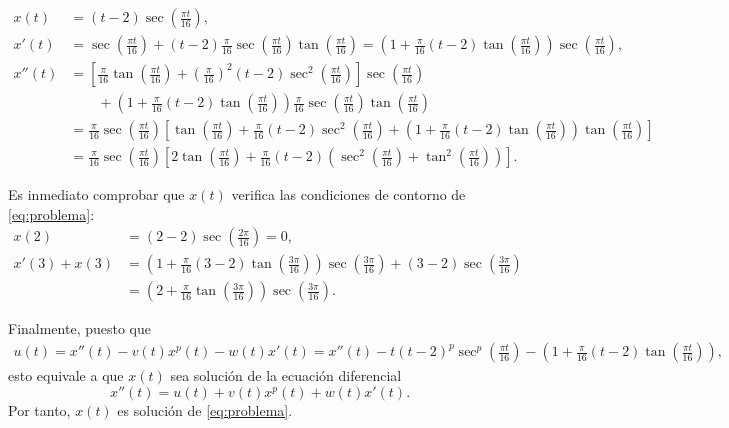 \documentclass[11pt]{article}
\begin{document}
\begin{align*}
    x(t) &= (t-2)\sec \left(\frac{\pi t}{16}\right),\\
    x'(t) &= \sec \left(\frac{\pi t}{16}\right) + (t-2)\frac{\pi}{16}\sec \left(\frac{\pi t}{16}\right)\tan\left(\frac{\pi t}{16}\right) = \left( 1+\frac{\pi}{16}(t-2)\tan\left(\frac{\pi t}{16}\right) \right) \sec \left(\frac{\pi t}{16}\right),\\
    x''(t) &= \left[ \frac{\pi}{16}\tan\left(\frac{\pi t}{16} \right) + \left(\frac{\pi}{16}\right)^2(t-2)\sec^2 \left(\frac{\pi t}{16}\right) \right]\sec \left(\frac{\pi t}{16}\right)\\
    & \qquad + \left( 1+\frac{\pi}{16}(t-2)\tan\left(\frac{\pi t}{16} \right) \right)\frac{\pi}{16}\sec\left(\frac{\pi t}{16} \right)\tan\left(\frac{\pi t}{16} \right)\\
    &=  \frac{\pi}{16}\sec\left(\frac{\pi t}{16} \right)\left[ \tan\left(\frac{\pi t}{16} \right) + \frac{\pi}{16}(t-2)\sec^2 \left(\frac{\pi t}{16}\right) + \left( 1+\frac{\pi}{16}(t-2)\tan\left(\frac{\pi t}{16} \right) \right)\tan\left(\frac{\pi t}{16} \right)\right]\\
    &= \frac{\pi}{16}\sec\left(\frac{\pi t}{16} \right)\left[ 2\tan\left(\frac{\pi t}{16} \right) + \frac{\pi}{16}(t-2)\left( \sec^2 \left(\frac{\pi t}{16}\right) + \tan^2 \left(\frac{\pi t}{16}\right) \right) \right].
\end{align*}

Es inmediato comprobar que $x(t)$  verifica las condiciones de contorno de \eqref{eq:problema}:
\begin{align*}
	x(2) &= (2-2) \sec \left(\frac{2\pi }{16}\right) = 0,\\
	x'(3)+x(3) &= \left( 1+\frac{\pi}{16}(3-2)\tan\left(\frac{3\pi}{16}\right) \right) \sec \left(\frac{3\pi}{16}\right) + (3-2)\sec \left(\frac{3\pi}{16}\right)\\
	& = \left( 2+\frac{\pi}{16}\tan\left(\frac{3\pi}{16}\right) \right)\sec\left(\frac{3\pi}{16}\right).
\end{align*}

Finalmente, puesto que 
\begin{align*}
u(t)=x''(t)-v(t)x^p(t)-w(t)x'(t)=x''(t)-t(t-2)^p\sec^p\left( \frac{\pi t}{16} \right) - \left(1+\frac{\pi}{16}(t-2)\tan\left( \frac{\pi t }{16} \right)\right),
\end{align*}
esto equivale a que $x(t)$ sea solución de la ecuación diferencial $$x''(t)=u(t)+v(t)x^p(t)+w(t)x'(t).$$ Por tanto, $x(t)$ es solución de \eqref{eq:problema}.\\
\end{document}
